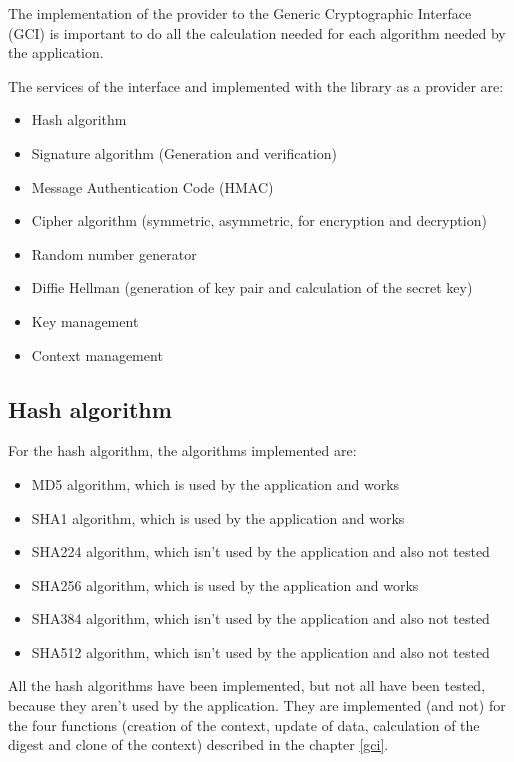 The implementation of the \tomcrypt provider to the Generic Cryptographic
Interface (GCI) is important to do all the calculation needed for each algorithm
needed by the application.

The services of the interface and implemented with the \tomcrypt library as a
provider are:
\begin{itemize}[noitemsep]
  \item Hash algorithm
  \item Signature algorithm (Generation and verification)
  \item Message Authentication Code (HMAC)
  \item Cipher algorithm (symmetric, asymmetric, for encryption and decryption)
  \item Random number generator
  \item Diffie Hellman (generation of key pair and calculation of the secret
  key)
  \item Key management
  \item Context management
\end{itemize}

\subsection*{Hash algorithm}

For the hash algorithm, the algorithms implemented are:
\begin{itemize}[noitemsep]
  \item MD5 algorithm, which is used by the \embtls application and works
  \item SHA1 algorithm, which is used by the \embtls application and works
  \item SHA224 algorithm, which isn't used by the \embtls application and also
  not tested
  \item SHA256 algorithm, which is used by the \embtls application and works
  \item SHA384 algorithm, which isn't used by the \embtls application and also
  not tested
  \item SHA512 algorithm, which isn't used by the \embtls application and also
  not tested
\end{itemize}

All the hash algorithms have been implemented, but not all have been tested,
because they aren't used by the \embtls application.
They are implemented (and not) for the four functions (creation of the
context, update of data, calculation of the digest and clone of the context)
described in the chapter \ref{gci}.

